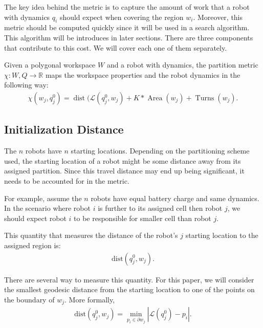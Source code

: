 \documentclass[../main.tex]{subfiles}
\begin{document}
The key idea behind the metric is to capture the amount of work that a robot with dynamics $q_i$ should expect when covering the region $w_i$. Moreover, this metric should be computed quickly since it will be used in a search algorithm. This algorithm will be introduces in later sections. There are three components that contribute to this cost. We will cover each one of them separately.

\begin{definition}
Given a polygonal workspace $W$ and a robot with dynamics, the partition metric $\chi:W,Q\to\mathbb{R}$ maps the workspace properties and the robot dynamics in the following way:
	\begin{equation}
		\begin{aligned}
			\chi(w_j,q_j^0)=\operatorname{dist}(\mathcal{L}(q^0_j,w_j)+K*\operatorname{Area}(w_j)+\operatorname{Turns}(w_j).
		\end{aligned}
	\end{equation}
\end{definition}


\subsection{Initialization Distance}

The $n$ robots have $n$ starting locations. Depending on the partitioning scheme used, the starting location of a robot might be some distance away from its assigned partition. Since this travel distance may end up being significant, it needs to be accounted for in the metric.

For example, assume the $n$ robots have equal battery charge and same dynamics. In the scenario where robot $i$ is further to its assigned cell then robot $j$, we should expect robot $i$ to be responsible for smaller cell than robot $j$.

This quantity that measures the distance of the robot's $j$ starting location to the assigned region is:
\begin{equation}
\begin{aligned}
	\text{dist}(q^0_j,w_j).
\end{aligned}
\end{equation}

There are several way to measure this quantity. For this paper, we will consider the smallest geodesic distance from the starting location to one of the points on the boundary of $w_j$. More formally,
\begin{equation}
\begin{aligned}
	\text{dist}(q^0_j,w_j)=\min_{p_i\in\partial w_j}|\mathcal{L}(q^0_j)-p_i|.
\end{aligned}
\end{equation}
\end{document}
